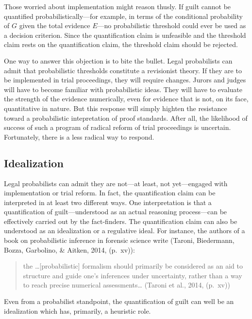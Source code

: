 \documentclass[10pt,dvipsnames,enabledeprecatedfontcommands]{scrartcl}
\begin{document}
\noindent Those worried about implementation might reason thusly. If
guilt cannot be quantified probabilistically---for example, in terms of
the conditional probability of \(G\) given the total evidence \(E\)---no
probabilistic threshold could ever be used as a decision criterion.
Since the quantification claim is unfeasible and the threshold claim
rests on the quantification claim, the threshold claim should be
rejected.

One way to answer this objection is to bite the bullet. Legal
probabilists can admit that probabilistic thresholds constitute a
revisionist theory. If they are to be implemented in trial proceedings,
they will require changes. Jurors and judges will have to become
familiar with probabilistic ideas. They will have to evaluate the
strength of the evidence numerically, even for evidence that is not, on
its face, quantitative in nature. But this response will simply highten
the resistance toward a probabilistic intepretation of proof standards.
After all, the likelihood of success of such a program of radical reform
of trial proceedings is uncertain. Fortunately, there is a less radical
way to respond.

\hypertarget{idealization}{%
\subsection{Idealization}\label{idealization}}

Legal probabilists can admit they are not---at least, not yet---engaged
with implementation or trial reform. In fact, the quantification claim
can be interpreted in at least two different ways. One interpretation is
that a quantification of guilt---understood as an actual reasoning
process---can be effectively carried out by the fact-finders. The
quantification claim can also be understood as an idealization or a
regulative ideal. For instance, the authors of a book on probabilistic
inference in forensic science write (Taroni, Biedermann, Bozza,
Garbolino, \& Aitken, 2014, (p.~xv)):

\begin{quote}
the \dots {[}probabilistic{]} formalism should primarily be considered
as an aid to structure and guide one's inferences under uncertainty,
rather than a way to reach precise numerical assessments\dots
\hspace*{\fill} (Taroni et al., 2014, (p.~xv))
\end{quote}

\noindent Even from a probabilist standpoint, the quantification of
guilt can well be an idealization which has, primarily, a heuristic
role.
\end{document}
